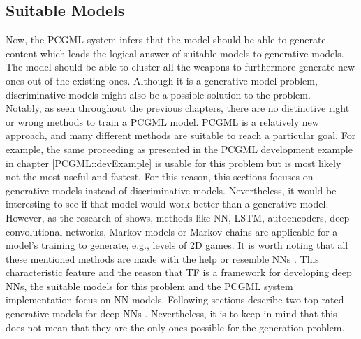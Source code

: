 \documentclass[MGS,Master,english]{twbook}%
\begin{document}
\subsection{Suitable Models}
Now, the PCGML system infers that the model should be able to generate content which leads the logical answer of suitable models to generative models. The model should be able to cluster all the weapons to furthermore generate new ones out of the existing ones. Although it is a generative model problem, discriminative models might also be a possible solution to the problem.\\ 
Notably, as seen throughout the previous chapters, there are no distinctive right or wrong methods to train a PCGML model. PCGML is a relatively new approach, and many different methods are suitable to reach a particular goal. For example, the same proceeding as presented in the PCGML development example in chapter \ref{PCGML::devExample} is usable for this problem but is most likely not the most useful and fastest. For this reason, this sections focuses on generative models instead of discriminative models. Nevertheless, it would be interesting to see if that model would work better than a generative model. \\
However, as the research of \cite{pcgml::paper} shows, methods like \ac{NN}, \ac{LSTM}, autoencoders, deep convolutional networks, Markov models or Markov chains are applicable for a model's training to generate, e.g., levels of \ac{2D} games. It is worth noting that all these mentioned methods are made with the help or resemble \acp{NN} \cite{neuralNetworkZoo}. This characteristic feature and the reason that \ac{TF} is a framework for developing deep \acp{NN}, the suitable models for this problem and the PCGML system implementation focus on \ac{NN} models. Following sections describe two top-rated generative models for deep \acp{NN} \cite{ml::vae::tutorial}. Nevertheless, it is to keep in mind that this does not mean that they are the only ones possible for the generation problem.
\end{document}
